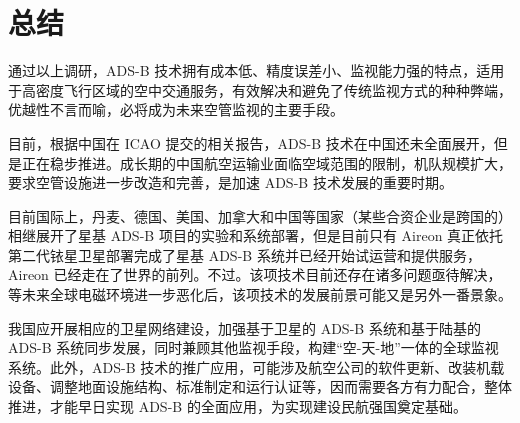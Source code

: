 
\chapter{总结}

通过以上调研，ADS-B 技术拥有成本低、精度误差小、监视能力强的特点，适用于高密度飞行区域的空中交通服务，有效解决和避免了传统监视方式的种种弊端，优越性不言而喻，必将成为未来空管监视的主要手段。

目前，根据中国在 ICAO 提交的相关报告，ADS-B 技术在中国还未全面展开，但是正在稳步推进。成长期的中国航空运输业面临空域范围的限制，机队规模扩大，要求空管设施进一步改造和完善，是加速 ADS-B  技术发展的重要时期。

目前国际上，丹麦、德国、美国、加拿大和中国等国家（某些合资企业是跨国的）相继展开了星基 ADS-B 项目的实验和系统部署，但是目前只有 Aireon 真正依托第二代铱星卫星部署完成了星基 ADS-B 系统并已经开始试运营和提供服务，Aireon 已经走在了世界的前列。不过。该项技术目前还存在诸多问题亟待解决，等未来全球电磁环境进一步恶化后，该项技术的发展前景可能又是另外一番景象。

我国应开展相应的卫星网络建设，加强基于卫星的 ADS-B 系统和基于陆基的 ADS-B 系统同步发展，同时兼顾其他监视手段，构建“空-天-地”一体的全球监视系统。此外，ADS-B 技术的推广应用，可能涉及航空公司的软件更新、改装机载设备、调整地面设施结构、标准制定和运行认证等，因而需要各方有力配合，整体推进，才能早日实现 ADS-B 的全面应用，为实现建设民航强国奠定基础。